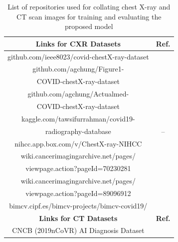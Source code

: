 \documentclass[10pt,journal,compsoc]{IEEEtran}
\begin{document}
\begin{table}[!t]
\renewcommand{\arraystretch}{1.3}
\caption{List of repositories used for collating chest X-ray and CT scan images for training and evaluating the proposed model}
\label{table_1}
\centering
\begin{tabular}{|c|c|}
\hline
 \bfseries Links for CXR Datasets & \bfseries Ref.\\
\hline
  github.com/ieee8023/covid-chestX-ray-dataset

&~\cite{cohen2020covid}\\
\hline
 github.com/agchung/Figure1-

& \\
 COVID-chestX-ray-dataset

&~\cite{wang2020covid}\\
\hline
 github.com/agchung/Actualmed-

&\\
 COVID-chestX-ray-dataset

&~\cite{wang2020covid}\\

\hline
kaggle.com/tawsifurrahman/covid19-

& \\
radiography-database

& --\\
\hline
 nihcc.app.box.com/v/ChestX-ray-NIHCC

&~\cite{wang2017chestx}\\
\hline
 wiki.cancerimagingarchive.net/pages/

& \\
viewpage.action?pageId=70230281

&~\cite{clark2013cancer}\\
\hline
wiki.cancerimagingarchive.net/pages/

& \\
 viewpage.action?pageId=89096912

&~\cite{clark2013cancer}\\
\hline
 bimcv.cipf.es/bimcv-projects/bimcv-covid19/

&~\cite{vaya2020bimcv}\\
\hline

\bfseries Links for CT Datasets & \bfseries Ref.\\
\hline
 CNCB (2019nCoVR) AI Diagnosis Dataset


\end{tabular}
\end{table}
\end{document}

